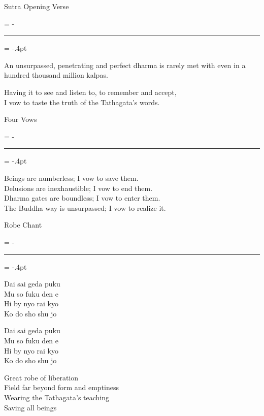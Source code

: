 \documentclass{minimal}
\def\myhrule{\par
  \tmpdim=\prevdepth
  \kern\dimexpr 4pt-\prevdepth
  \hrule
  \prevdepth=\tmpdim
  \kern\dimexpr \prevdepth-4pt-.4pt\relax
}
\def\section#1{%
  \vskip 1cm
  {#1\centering\par}
  \myhrule
  \par
}
\begin{document}
\fontsize{12pt}{14pt}\selectfont

\section{Sutra Opening Verse}
\begin{center}
An unsurpassed, penetrating and perfect dharma is rarely met with even in a
hundred thousand million kalpas.

Having it to see and listen to, to remember and accept,\\
I vow to taste the truth of the Tathagata's words.
\end{center}

\section{Four Vows}
\begin{center}
Beings are numberless; I vow to save them.\\
Delusions are inexhaustible; I vow to end them.\\
Dharma gates are boundless; I vow to enter them.\\
The Buddha way is unsurpassed; I vow to realize it.
\end{center}

\newpage

\section{Robe Chant}
\def\robechant{%
\begin{center}
Dai sai geda puku\\
Mu so fuku den e\\
Hi by nyo rai kyo\\
Ko do sho shu jo
\end{center}}
\parbox[b]{.5\textwidth}{\robechant}
\parbox[b]{.5\textwidth}{\robechant}
\begin{center}
  Great robe of liberation\\
  Field far beyond form and emptiness\\
  Wearing the Tathagata's teaching\\
  Saving all beings
\end{center}
\end{document}
